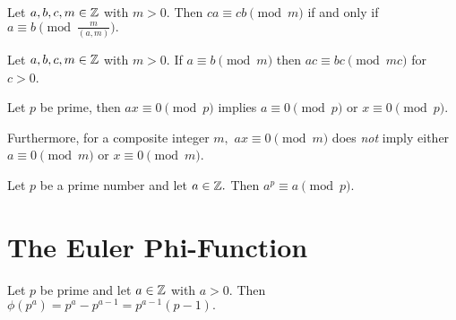 \documentclass[letterpaper, 11 pt]{ximera}
\begin{document}
    


\begin{proposition}[Proposition 2.5]\label{prop:equiv-gcd}
    Let $a,b,c,m\in\mathbb Z$ with $m>0.$ Then $ca\equiv cb\pmod{m}$ if and only if $a\equiv b\pmod{\tfrac{m}{(a,m)}}.$
\end{proposition}


\begin{lemma}\label{ex:equiv-upmod}
    Let $a,b,c,m\in\mathbb Z$ with $m>0.$ If $a\equiv b \pmod{m}$ then $ac\equiv bc \pmod{mc}$ for $c>0$.
\end{lemma}


\begin{proposition}\label{prop:zero-divisors}
    Let $p$ be prime, then $ax\equiv 0\pmod{p}$ implies $a\equiv 0\pmod{p}$ or $x\equiv 0\pmod{p}.$ 

    Furthermore, for a composite integer $m,$ $ax\equiv 0\pmod{m}$ does \emph{not} imply either $a\equiv 0\pmod{m}$ or $x\equiv 0\pmod{m}.$ 
\end{proposition}

\begin{corollary}[Corollary 2.15]\label{cor:a_power_prime_mod}
    Let $p$ be a prime number and let $a\in\mathbb Z.$ Then $a^p\equiv a\pmod{p}.$
\end{corollary}

\section{The Euler Phi-Function}

\begin{theorem}[Theorem 3.3]\label{thm:phi-prime-power}
    Let $p$ be prime and let $a\in\mathbb Z$ with $a>0.$ Then $\phi(p^a)=p^a-p^{a-1}=p^{a-1}(p-1).$
\end{theorem}
\end{document}
